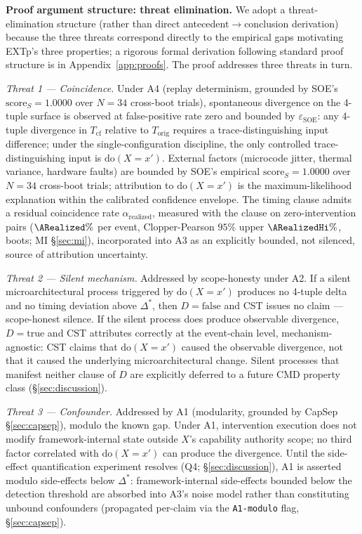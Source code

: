 \documentclass[conference]{IEEEtran}
\newcommand{\Korig}{T_\text{orig}}
\newcommand{\Tcf}{T_\text{cf}}
\newcommand{\Dstar}{\Delta^{*}}
\newcommand{\arealized}{\alpha_\text{realized}}
\newcommand{\scoreS}{\text{score}_S}
\newcommand{\dox}[1]{\text{do}(X{=}#1)}
\newcommand{\epsSOE}{\varepsilon_\text{SOE}}
\begin{document}
\textbf{Proof argument structure: threat elimination.} We adopt a
threat-elimination structure (rather than direct
antecedent$\rightarrow$conclusion derivation) because the three
threats correspond directly to the empirical gaps motivating EXTp's
three properties; a rigorous formal derivation following standard
proof structure is in Appendix~\ref{app:proofs}. The proof addresses
three threats in turn.

\emph{Threat 1 --- Coincidence.} Under A4 (replay determinism,
grounded by SOE's $\scoreS = 1.0000$ over $N{=}34$ cross-boot
trials), spontaneous divergence on the 4-tuple surface is observed
at false-positive rate zero and bounded by $\epsSOE$: any 4-tuple
divergence in $\Tcf$
relative to $\Korig$ requires a trace-distinguishing input
difference; under the single-configuration discipline, the only
controlled trace-distinguishing input is $\dox{x'}$. External
factors (microcode jitter, thermal variance, hardware faults) are
bounded by SOE's empirical $\scoreS = 1.0000$ over $N{=}34$
cross-boot trials; attribution to $\dox{x'}$ is the
maximum-likelihood explanation within the calibrated confidence
envelope. The timing clause admits a residual coincidence rate
$\arealized$, measured with the clause on zero-intervention pairs
($\ARealized\%$ per event, Clopper-Pearson $95\%$ upper $\ARealizedHi\%$, \NullBoots{} boots;
MI \S\ref{sec:mi}), incorporated into A3 as an
explicitly bounded, not silenced, source of attribution uncertainty.

\emph{Threat 2 --- Silent mechanism.} Addressed by scope-honesty
under A2. If a silent microarchitectural process triggered by
$\dox{x'}$ produces no 4-tuple delta and no timing deviation above
$\Dstar$, then $D = \text{false}$ and CST issues no claim ---
scope-honest silence. If the silent process does produce observable
divergence, $D = \text{true}$ and CST attributes correctly at the
event-chain level, mechanism-agnostic: CST claims that $\dox{x'}$
caused the observable divergence, not that it caused the underlying
microarchitectural change. Silent processes that manifest neither
clause of $D$ are explicitly deferred to a future CMD
property class (\S\ref{sec:discussion}).

\emph{Threat 3 --- Confounder.} Addressed by A1 (modularity,
grounded by CapSep \S\ref{sec:capsep}), modulo the known gap. Under
A1, intervention execution does not modify framework-internal state
outside $X$'s capability authority scope; no third factor correlated
with $\dox{x'}$ can produce the divergence. Until the side-effect
quantification experiment resolves (Q4; \S\ref{sec:discussion}), A1
is asserted modulo side-effects below $\Dstar$: framework-internal
side-effects bounded below the detection threshold are absorbed into
A3's noise model rather than constituting unbound confounders
(propagated per-claim via the \texttt{A1-modulo} flag,
\S\ref{sec:capsep}).
\end{document}
